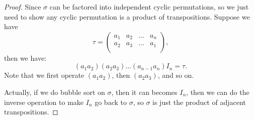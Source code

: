 \begin{proof}
    Since \(\sigma \) can be factored into independent cyclic permutations, so we just need to show any cyclic permutation is a product of transpositions. Suppose we have 
    \[
        \tau = \begin{pmatrix}
            a_1 & a_2 & \dots  & a_n  \\
            a_2 & a_3 & \dots  & a_1  \\
        \end{pmatrix},
    \] then we have:
    \[
        (a_1 a_2) (a_2 a_3) \dots (a_{n-1} a_n) I_n = \tau .
    \]
    Note that we first operate \((a_1 a_2)\), then \((a_2 a_3)\), and so on.
    
    Actually, if we do bubble sort on \(\sigma \), then it can becomes \(I_n\), then we can do the inverse operation to make \(I_n\) go back to \(\sigma \), so \(\sigma \) is just the product of adjacent transpositions.     
\end{proof}

